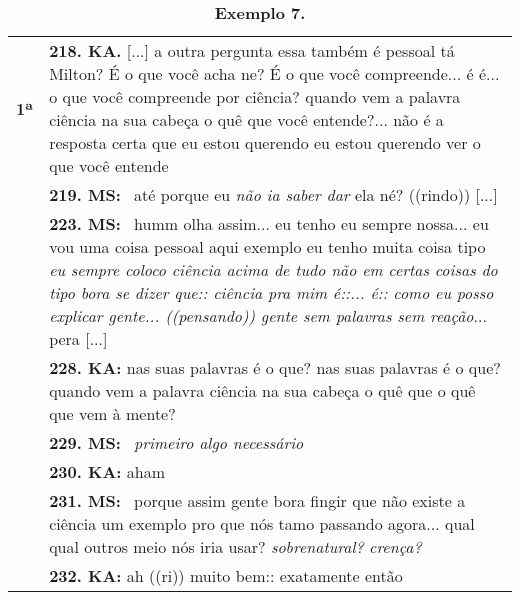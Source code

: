 \begin{table}[h]
	\centering
	\small
	\begin{threeparttable}
		\caption*{\textbf{Exemplo 7.} }
		\label{tab-08}
		\begin{tabular}{@{} 
				>{\raggedright\arraybackslash}p{} 
				>{\raggedright\arraybackslash}p{} @{}}
			\toprule\noalign{}
			\multirow{2}{*}{Milton Santos: compreensão de ciência}
			
			\\
			\midrule\noalign{}
			
			
			
			
			\textbf{1ª } & \textbf{218. KA.} {[}...{]} a outra pergunta essa também é pessoal tá Milton? É o que você acha ne? É o que você compreende... é é... o que você compreende por ciência? quando vem a palavra ciência na sua cabeça o quê que você entende?... não é a resposta certa que eu estou querendo eu estou querendo ver o que você entende \\
			
			& \textbf{219. MS:} ~até porque eu \emph{não ia saber dar} ela né? ((rindo)) {[}...{]} \\
			
			& \textbf{223. MS:} ~humm olha assim... eu tenho eu sempre nossa... eu vou uma coisa pessoal aqui exemplo eu tenho muita coisa tipo \emph{eu sempre coloco ciência acima de tudo não em certas coisas do tipo bora se dizer que:: ciência pra mim é::... é:: como eu posso explicar gente... ((pensando)) gente sem palavras sem reação}... pera {[}...{]} \\
			
			& \textbf{228. KA: }nas suas palavras é o que? nas suas palavras é o que? quando vem a palavra ciência na sua cabeça o quê que o quê que vem à mente? \\
			
			& \textbf{229. MS:} ~\emph{primeiro algo necessário} \\
			
			& \textbf{230. KA: }aham \\
			
			& \textbf{231. MS:} ~porque assim gente bora fingir que não existe a ciência um exemplo pro que nós tamo passando agora... qual qual outros meio nós iria usar? \emph{sobrenatural?} \emph{crença?} \\
			
			& \textbf{232. KA: }ah ((ri)) muito bem:: exatamente então \\
			

\end{tabular}
\end{threeparttable}
\end{table}
